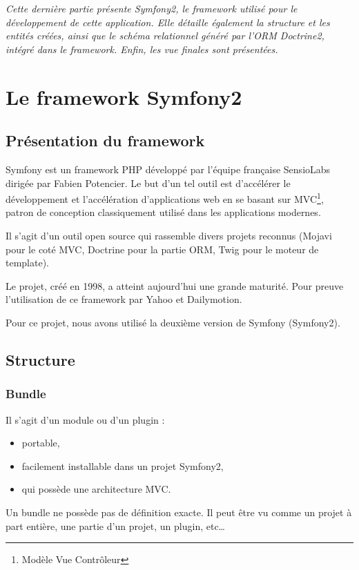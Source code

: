 \textit{Cette dernière partie présente Symfony2, le framework utilisé pour le développement de cette application. Elle détaille également la structure et les entités créées, ainsi que le schéma relationnel généré par l'ORM Doctrine2, intégré dans le framework. Enfin, les vue finales sont présentées.}

\section{Le framework Symfony2}
\subsection{Présentation du framework}
Symfony est un framework PHP développé par l'équipe française SensioLabs dirigée par Fabien Potencier. Le but d'un tel outil est d’accélérer le développement et l'accélération d'applications web en se basant sur MVC\footnote{Modèle Vue Contrôleur}, patron de conception classiquement utilisé dans les applications modernes.

Il s'agit d'un outil open source qui rassemble divers projets reconnus (Mojavi pour le coté MVC, Doctrine pour la partie ORM, Twig pour le moteur de template).

Le projet, créé en 1998, a atteint aujourd'hui une grande maturité. Pour preuve l'utilisation de ce framework par Yahoo et Dailymotion.

Pour ce projet, nous avons utilisé la deuxième version de Symfony (Symfony2).

\subsection{Structure}

\subsubsection{Bundle}
Il s'agit d'un module ou d'un plugin :
\begin{itemize}
\item portable,
\item facilement installable dans un projet Symfony2,
\item qui possède une architecture MVC.
\end{itemize}

Un bundle ne possède pas de définition exacte. Il peut être vu comme un projet à part entière, une partie d'un projet, un plugin, etc\ldots

